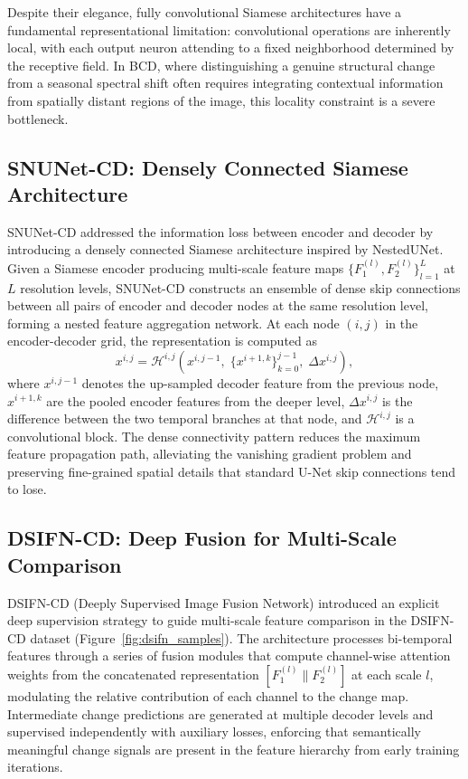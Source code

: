 Despite their elegance, fully convolutional Siamese architectures have a fundamental representational limitation: convolutional operations are inherently local, with each output neuron attending to a fixed neighborhood determined by the receptive field. In \ac{BCD}, where distinguishing a genuine structural change from a seasonal spectral shift often requires integrating contextual information from spatially distant regions of the image, this locality constraint is a severe bottleneck.

\subsection{SNUNet-CD: Densely Connected Siamese Architecture}

SNUNet-CD \cite{Fang2021SNUNetCD} addressed the information loss between encoder and decoder by introducing a densely connected Siamese architecture inspired by NestedUNet. Given a Siamese encoder producing multi-scale feature maps $\{F_1^{(l)}, F_2^{(l)}\}_{l=1}^{L}$ at $L$ resolution levels, SNUNet-CD constructs an ensemble of dense skip connections between all pairs of encoder and decoder nodes at the same resolution level, forming a nested feature aggregation network. At each node $(i, j)$ in the encoder-decoder grid, the representation is computed as
\begin{equation}
x^{i,j} = \mathcal{H}^{i,j}\!\left(
    x^{i,j-1},\;
    \bigl\{ x^{i+1, k} \bigr\}_{k=0}^{j-1},\;
    \Delta x^{i,j}
\right),
\label{eq:snunet}
\end{equation}
where $x^{i,j-1}$ denotes the up-sampled decoder feature from the previous node, $x^{i+1, k}$ are the pooled encoder features from the deeper level, $\Delta x^{i,j}$ is the difference between the two temporal branches at that node, and $\mathcal{H}^{i,j}$ is a convolutional block. The dense connectivity pattern reduces the maximum feature propagation path, alleviating the vanishing gradient problem and preserving fine-grained spatial details that standard U-Net skip connections tend to lose.

\subsection{DSIFN-CD: Deep Fusion for Multi-Scale Comparison}

DSIFN-CD (Deeply Supervised Image Fusion Network) \cite{Zhang2020FusionNetDSIFN} introduced an explicit deep supervision strategy to guide multi-scale feature comparison in the DSIFN-CD dataset (Figure~\ref{fig:dsifn_samples}). The architecture processes bi-temporal features through a series of fusion modules that compute channel-wise attention weights from the concatenated representation $[F_1^{(l)} \| F_2^{(l)}]$ at each scale $l$, modulating the relative contribution of each channel to the change map. Intermediate change predictions are generated at multiple decoder levels and supervised independently with auxiliary losses, enforcing that semantically meaningful change signals are present in the feature hierarchy from early training iterations.

